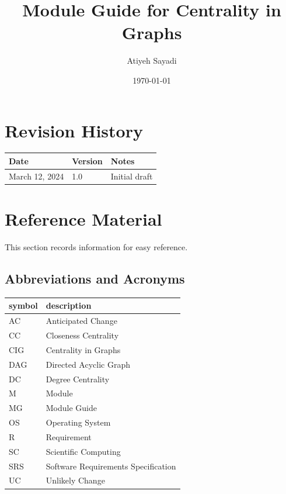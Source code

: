 \documentclass[12pt, titlepage]{article}
\begin{document}
\title{Module Guide for Centrality in Graphs} 
\author{Atiyeh Sayadi}
\date{\today}

\maketitle


\section{Revision History}

\begin{tabularx}{\textwidth}{p{3cm}p{2cm}X}
\toprule {\bf Date} & {\bf Version} & {\bf Notes}\\
\midrule
March 12, 2024 & 1.0 & Initial draft\\
\bottomrule
\end{tabularx}

\newpage

\section{Reference Material}

This section records information for easy reference.

\subsection{Abbreviations and Acronyms}

\renewcommand{\arraystretch}{1.2}
\begin{tabular}{l l} 
  \toprule		
  \textbf{symbol} & \textbf{description}\\
  \midrule 
  AC & Anticipated Change\\
CC & Closeness Centrality\\
  CIG& Centrality in Graphs\\
  DAG & Directed Acyclic Graph \\
DC & Degree Centrality\\
  M & Module \\
  MG & Module Guide \\
  OS & Operating System \\
  R & Requirement\\
  SC & Scientific Computing \\
  SRS & Software Requirements Specification\\
  UC & Unlikely Change \\
  \bottomrule
\end{tabular}\\
\end{document}
